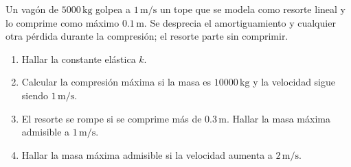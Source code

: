 Un vagón de \(5000\,\mathrm{kg}\) golpea a \(1\,\mathrm{m/s}\) un tope que se modela como resorte lineal y lo comprime como máximo \(0.1\,\mathrm m\). Se desprecia el amortiguamiento y cualquier otra pérdida durante la compresión; el resorte parte sin comprimir.

\begin{enumerate}[label=(\alph*),ref=\alph*,leftmargin=*]
\item Hallar la constante elástica \(k\).
\item Calcular la compresión máxima si la masa es \(10000\,\mathrm{kg}\) y la velocidad sigue siendo \(1\,\mathrm{m/s}\).
\item El resorte se rompe si se comprime más de \(0.3\,\mathrm m\). Hallar la masa máxima admisible a \(1\,\mathrm{m/s}\).
\item Hallar la masa máxima admisible si la velocidad aumenta a \(2\,\mathrm{m/s}\).
\end{enumerate}
